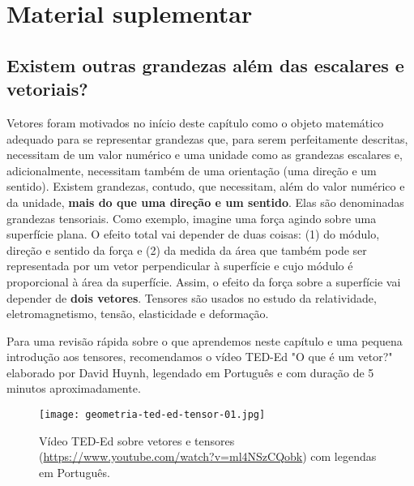 \section{Material suplementar}
\label{\detokenize{GE101-E:material-suplementar}}

\subsection{Existem outras grandezas além das escalares e vetoriais?}
\label{\detokenize{GE101-E:existem-outras-grandezas-alem-das-escalares-e-vetoriais}}
Vetores foram motivados no início deste capítulo como o objeto matemático adequado para se representar grandezas que, para serem perfeitamente descritas, necessitam de um valor numérico e uma unidade \textendash{} como as grandezas escalares \textendash{} e, adicionalmente, necessitam também de uma orientação (uma direção e um sentido). Existem grandezas, contudo, que necessitam, além do valor numérico e da unidade, \textbf{mais do que uma direção e um sentido}. Elas são denominadas grandezas tensoriais. Como exemplo, imagine uma força agindo sobre uma superfície plana. O efeito total vai depender de duas coisas: (1) do módulo, direção e sentido da força e (2) da medida da área que também pode ser representada por um vetor perpendicular à superfície e cujo módulo é proporcional à área da superfície. Assim, o efeito da força sobre a superfície vai depender de \textbf{dois vetores}. Tensores são usados no estudo da relatividade, eletromagnetismo, tensão, elasticidade e deformação.

Para uma revisão rápida sobre o que aprendemos neste capítulo e uma pequena introdução aos tensores, recomendamos o vídeo TED-Ed "O que é um vetor?"{} elaborado por David Huynh, legendado em Português e com duração de 5 minutos aproximadamente.

\begin{figure}[H]
\centering
\capstart

\texttt{[image: geometria-ted-ed-tensor-01.jpg]}
\caption{Vídeo TED-Ed sobre vetores e tensores (\url{https://www.youtube.com/watch?v=ml4NSzCQobk}) com legendas em Português.}
\label{\detokenize{GE101-E:fig-geometria-ted-ed-tensor-01}}\label{\detokenize{GE101-E:id7}}
\end{figure}


